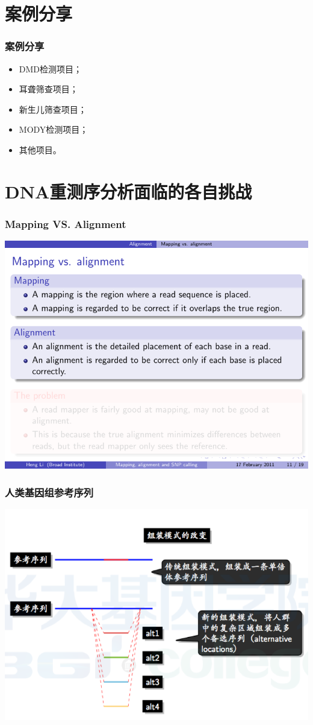 \documentclass[12pt]{beamer}
\begin{document}
\section{案例分享}
\begin{frame}\frametitle{案例分享}
  \begin{itemize}
  \item DMD检测项目；
  \item 耳聋筛查项目；
  \item 新生儿筛查项目；
  \item MODY检测项目；
  \item 其他项目。
  \end{itemize}
\end{frame}
\section{DNA重测序分析面临的各自挑战}
\begin{frame}\frametitle{Mapping VS. Alignment}
  \includegraphics[width=\textwidth]{figures/mappingalign.pdf}  
\end{frame}
\begin{frame}\frametitle{人类基因组参考序列}
  \includegraphics[width=\textwidth]{figures/old_slides/humanref.png}  
\end{frame}
\end{document}

